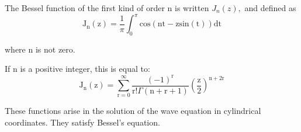 The Bessel function of the first kind of order n is written $J_{n}(z),$  and defined as
\[ \mathrm{J}_{\mathrm{n}}\mathrm{(z)} = 
\frac{1}{\pi} \int_0^{\pi} \mathrm{cos(nt - zsin(t))dt} \]
\par
where n is not zero.
\par
If n is a positive integer, this is equal to:
\[ \mathrm{J}_{\mathrm{n}}\mathrm{(z)} =
\sum_{\mathrm{r}=0}^{\infty} 
\frac{(-1)^{\mathrm{r}}}
{\mathrm{r!} \Gamma \mathrm{(n+r+1)}}
\left ( \frac{\mathrm{z}}{2} \right ) ^ { \mathrm{n+2r}} \]
\par
These functions arise in the solution of the wave equation in cylindrical 
coordinates. They satisfy Bessel's equation.

